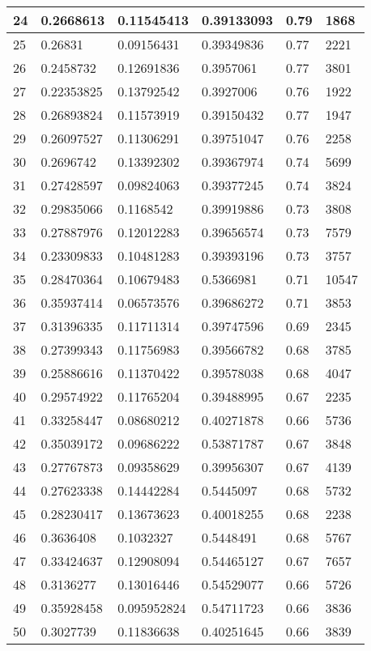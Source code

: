 \begin{longtable}{|l|l|l|l|l|l|}
24 & 0.2668613 & 0.11545413 & 0.39133093 & 0.79 & 1868 \\ \hline 
25 & 0.26831 & 0.09156431 & 0.39349836 & 0.77 & 2221 \\ \hline 
26 & 0.2458732 & 0.12691836 & 0.3957061 & 0.77 & 3801 \\ \hline 
27 & 0.22353825 & 0.13792542 & 0.3927006 & 0.76 & 1922 \\ \hline 
28 & 0.26893824 & 0.11573919 & 0.39150432 & 0.77 & 1947 \\ \hline 
29 & 0.26097527 & 0.11306291 & 0.39751047 & 0.76 & 2258 \\ \hline 
30 & 0.2696742 & 0.13392302 & 0.39367974 & 0.74 & 5699 \\ \hline 
31 & 0.27428597 & 0.09824063 & 0.39377245 & 0.74 & 3824 \\ \hline 
32 & 0.29835066 & 0.1168542 & 0.39919886 & 0.73 & 3808 \\ \hline 
33 & 0.27887976 & 0.12012283 & 0.39656574 & 0.73 & 7579 \\ \hline 
34 & 0.23309833 & 0.10481283 & 0.39393196 & 0.73 & 3757 \\ \hline 
35 & 0.28470364 & 0.10679483 & 0.5366981 & 0.71 & 10547 \\ \hline 
36 & 0.35937414 & 0.06573576 & 0.39686272 & 0.71 & 3853 \\ \hline 
37 & 0.31396335 & 0.11711314 & 0.39747596 & 0.69 & 2345 \\ \hline 
38 & 0.27399343 & 0.11756983 & 0.39566782 & 0.68 & 3785 \\ \hline 
39 & 0.25886616 & 0.11370422 & 0.39578038 & 0.68 & 4047 \\ \hline 
40 & 0.29574922 & 0.11765204 & 0.39488995 & 0.67 & 2235 \\ \hline 
41 & 0.33258447 & 0.08680212 & 0.40271878 & 0.66 & 5736 \\ \hline 
42 & 0.35039172 & 0.09686222 & 0.53871787 & 0.67 & 3848 \\ \hline 
43 & 0.27767873 & 0.09358629 & 0.39956307 & 0.67 & 4139 \\ \hline 
44 & 0.27623338 & 0.14442284 & 0.5445097 & 0.68 & 5732 \\ \hline 
45 & 0.28230417 & 0.13673623 & 0.40018255 & 0.68 & 2238 \\ \hline 
46 & 0.3636408 & 0.1032327 & 0.5448491 & 0.68 & 5767 \\ \hline 
47 & 0.33424637 & 0.12908094 & 0.54465127 & 0.67 & 7657 \\ \hline 
48 & 0.3136277 & 0.13016446 & 0.54529077 & 0.66 & 5726 \\ \hline 
49 & 0.35928458 & 0.095952824 & 0.54711723 & 0.66 & 3836 \\ \hline 
50 & 0.3027739 & 0.11836638 & 0.40251645 & 0.66 & 3839 \\ \hline 
\end{longtable}